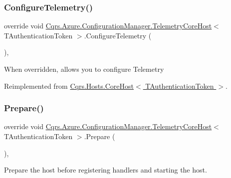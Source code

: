 \subsubsection{\texorpdfstring{Configure\+Telemetry()}{ConfigureTelemetry()}}
{\footnotesize\ttfamily override void \hyperlink{classCqrs_1_1Azure_1_1ConfigurationManager_1_1TelemetryCoreHost}{Cqrs.\+Azure.\+Configuration\+Manager.\+Telemetry\+Core\+Host}$<$ T\+Authentication\+Token $>$.Configure\+Telemetry (\begin{DoxyParamCaption}{ }\end{DoxyParamCaption})\hspace{0.3cm}{\ttfamily [protected]}, {\ttfamily [virtual]}}



When overridden, allows you to configure Telemetry 



Reimplemented from \hyperlink{classCqrs_1_1Hosts_1_1CoreHost_a8035dd83f62ec6184854e7e833be5db9_a8035dd83f62ec6184854e7e833be5db9}{Cqrs.\+Hosts.\+Core\+Host$<$ T\+Authentication\+Token $>$}.

\mbox{\label{classCqrs_1_1Azure_1_1ConfigurationManager_1_1TelemetryCoreHost_a620cb9c1ceb78a8f23b45ae749199fd4_a620cb9c1ceb78a8f23b45ae749199fd4}} 
\subsubsection{\texorpdfstring{Prepare()}{Prepare()}}
{\footnotesize\ttfamily override void \hyperlink{classCqrs_1_1Azure_1_1ConfigurationManager_1_1TelemetryCoreHost}{Cqrs.\+Azure.\+Configuration\+Manager.\+Telemetry\+Core\+Host}$<$ T\+Authentication\+Token $>$.Prepare (\begin{DoxyParamCaption}{ }\end{DoxyParamCaption})\hspace{0.3cm}{\ttfamily [protected]}, {\ttfamily [virtual]}}



Prepare the host before registering handlers and starting the host. 



